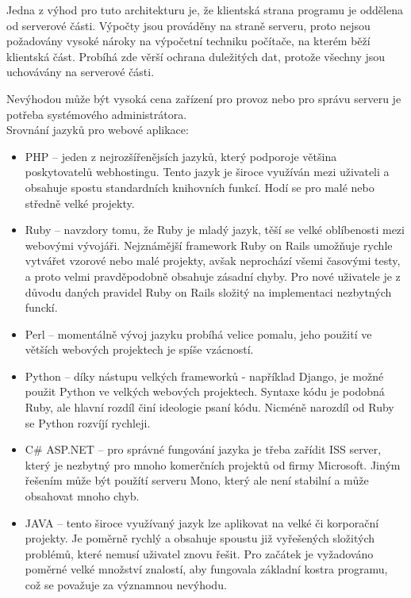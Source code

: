             Jedna z výhod pro tuto architekturu je, že klientská strana programu je oddělena od serverové části. Výpočty jsou prováděny na straně serveru, proto nejsou požadovány vysoké nároky na výpočetní techniku počítače, na kterém běží klientská část. Probíhá zde věrší ochrana duležitých dat, protože všechny jsou uchovávány na serverové části.
            
            Nevýhodou může být vysoká cena zařízení pro provoz nebo pro správu serveru je potřeba systémového administrátora.\\
            Srovnání jazyků pro webové aplikace:
            
            \begin{itemize}
                \item PHP – jeden z nejrozšířenějsích jazyků, který podporoje většina poskytovatelů webhostingu. Tento jazyk je široce využíván mezi uživateli a obsahuje spostu standardních knihovních funkcí. Hodí se pro malé nebo středně velké projekty.
                \item Ruby – navzdory tomu, že Ruby je mladý jazyk, těší se velké oblíbenosti mezi webovými vývojáři. Nejznámější framework Ruby on Rails umožňuje rychle vytvářet vzorové nebo malé projekty, avšak neprochází všemi časovými testy, a proto velmi pravděpodobně obsahuje zásadní chyby. Pro nové uživatele je z důvodu daných pravidel Ruby on Rails složitý na implementaci nezbytných funckí.
                \item Perl – momentálně vývoj jazyku probíhá velice pomalu, jeho použití ve větších webových projektech je spíše vzácností.
                \item Python – díky nástupu velkých frameworků - například Django, je možné použit Python ve velkých webových projektech. Syntaxe kódu je podobná Ruby, ale hlavní rozdíl činí ideologie psaní kódu. Nicméně narozdíl od Ruby se Python rozvíjí rychleji.
                \item C\# ASP.NET – pro správné fungování jazyka je třeba zařídit ISS server, který je nezbytný pro mnoho komerčních projektů od firmy Microsoft. Jiným řešením může být použítí serveru Mono, který ale není stabilní a může obsahovat mnoho chyb.
                \item JAVA – tento široce využívaný jazyk lze aplikovat na velké či korporační projekty. Je poměrně rychlý a obsahuje spoustu již vyřešených složitých problémů, které nemusí uživatel znovu řešit. Pro začátek je vyžadováno poměrné velké množství znalostí, aby fungovala základní kostra programu, což se považuje za významnou nevýhodu.
            \end{itemize}
            
